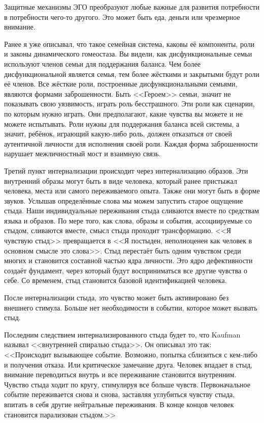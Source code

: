 \documentclass[10pt, fleqn]{article}
\begin{document}
Защитные механизмы ЭГО преобразуют любые важные для развития потребности в потребности чего-то другого. Это может быть еда, деньги или чрезмерное внимание.


Ранее я уже описывал, что такое семейная система, каковы её компоненты, роли и законы динамического гомеостаза. Вы видели, как дисфункциональные семьи используют членов семьи для поддержания баланса. Чем более дисфункциональной является семья, тем более жёсткими и закрытыми будут роли её членов.
Все жёсткие роли, построенные дисфункциональными семьями, являются формами заброшенности. Быть <<Героем>> семьи, значит не показывать свою уязвимость, играть роль бесстрашного. Эти роли как сценарии, по которым нужно играть. Они предполагают, какие чувства вы можете и не можете испытывать.
Роли нужны для поддержания баланса всей системы, а значит, ребёнок, играющий какую-либо роль, должен отказаться от своей аутентичной личности для исполнения своей роли.
Каждая форма заброшенности нарушает межличностный мост и взаимную связь.


Третий пункт интернализации происходит через интернализацию образов. Эти внутренний образы могут быть в виде человека, который ранее пристыжал человека, места или самого переживаемого опыта. Также они могут быть в форме звуков. Услышав определённые слова мы можем запустить старое ощущение стыда. Наши индивидуальные переживания стыда сливаются вместе по средствам языка и образов. По мере того, как слова, образы и события, ассоциируемые со стыдом, сливаются вместе, смысл стыда проходит трансформацию. <<Я чувствую стыд>> превращается в <<Я постыден, неполноценен как человек в основном смысле это слова>>. Стыд перестаёт быть одним чувством среди многих и становится составной частью ядра личности. Это ядро дефективности создаёт фундамент, через который будут восприниматься все другие чувства о себе. Со временем, стыд становится базовой идентификацией человека.


После интернализации стыда, это чувство может быть активировано без внешнего стимула. Больше нет необходимости в событии, которое может вызвать стыд.


Последним следствием интернализированного стыда будет то, что Kaufman называл <<внутренней спиралью стыда>>. Он описывал это так:
<<Происходит вызывающее событие. Возможно, попытка сблизиться с кем-либо и получения отказа. Или критическое замечание друга. Человек впадает в стыд, внимание переводиться внутрь и все переживание становится внутренним. Чувство стыда ходит по кругу, стимулируя все больше чувств. Первоначальное событие переживается снова и снова, заставляя углубиться чувству стыда, впитать в себя другие нейтральные переживания. В конце концов человек становится парализован стыдом.>>
\end{document}
